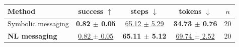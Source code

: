 \begin{tabular}{lcccc}
\toprule
Method & success $\uparrow$ & steps $\downarrow$ & tokens $\downarrow$ & $n$ \\
\midrule
Symbolic messaging & \textbf{0.82 $\pm$ 0.05} & \underline{65.12 $\pm$ 5.29} & \textbf{34.73 $\pm$ 0.76} & 20 \\
\textbf{NL messaging} & \underline{0.82 $\pm$ 0.05} & \textbf{65.11 $\pm$ 5.12} & \underline{69.74 $\pm$ 2.52} & 20 \\
\bottomrule
\end{tabular}
